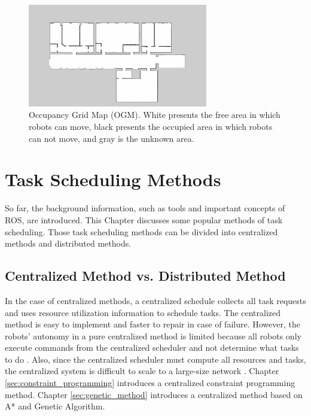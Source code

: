 \begin{enumerate}
 \begin{figure}[htbp]
 \centering
 \includegraphics[width = 0.7\textwidth]{content/images/ch2/occupancy_grid.png}
 \caption{Occupancy Grid Map (OGM). White presents the free area in which robots can move, black presents the occupied area in which robots can not move, and gray is the unknown area.}
 \label{fig:occupancy_grid}
 \end{figure}
\end{enumerate}


\section{Task Scheduling Methods}
\label{sec:exist_task_scheduling_methods}
So far, the background information, such as tools and important concepts of ROS, are introduced. This Chapter discusses some popular methods of task scheduling. Those task scheduling methods can be divided into centralized methods and distributed methods.

\subsection{Centralized Method vs. Distributed Method}
In the case of centralized methods, a centralized schedule collects all task requests and uses resource utilization information to schedule tasks. The centralized method is easy to implement and faster to repair in case of failure. However, the robots' autonomy in a pure centralized method is limited because all robots only execute commands from the centralized scheduler and not determine what tasks to do \cite{NUNES201755}. Also, since the centralized scheduler must compute all resources and tasks, the centralized system is difficult to scale to a large-size network \cite{CHRISTODOULOPOULOS20091172}.
Chapter \ref{sec:constraint_programming} introduces a centralized constraint programming method. Chapter \ref{sec:genetic_method} introduces a centralized method based on A* and Genetic Algorithm.

